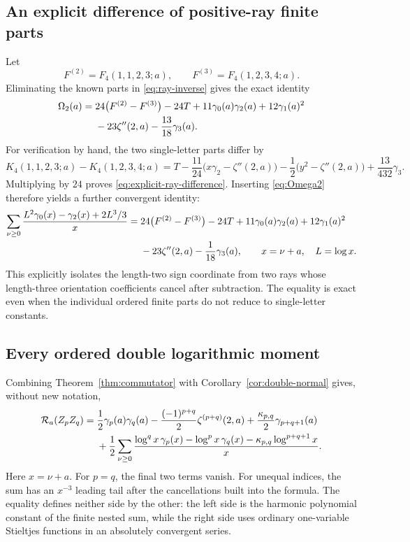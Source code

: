\documentclass[11pt]{article}
\numberwithin{equation}{section}
\theoremstyle{definition}
\newcommand{\R}{\mathcal R}
\begin{document}
\subsection{An explicit difference of positive-ray finite parts}
Let
\[
 F^{(2)}=F_4(1,1,2,3;a),\qquad F^{(3)}=F_4(1,2,3,4;a).
\]
Eliminating the known parts in \eqref{eq:ray-inverse} gives the exact
identity
\begin{align}\label{eq:explicit-ray-difference}
 \Omega_2(a)={}&24\bigl(F^{(2)}-F^{(3)}\bigr)-24T
 +11\gamma_0(a)\gamma_2(a)+12\gamma_1(a)^2\notag\\
 &-23\zeta''(2,a)-\frac{13}{18}\gamma_3(a).
\end{align}
For verification by hand, the two single-letter parts differ by
\[
 K_4(1,1,2,3;a)-K_4(1,2,3,4;a)
 =T-\frac{11}{24}\bigl(x\gamma_2-\zeta''(2,a)\bigr)
    -\frac12\bigl(y^2-\zeta''(2,a)\bigr)+\frac{13}{432}\gamma_3.
\]
Multiplying by $24$ proves \eqref{eq:explicit-ray-difference}. Inserting
\eqref{eq:Omega2} therefore yields a further convergent identity:
\begin{align}\label{eq:ray-Stieltjes-series}
 \sum_{\nu\ge0}\frac{L^2\gamma_0(x)-\gamma_2(x)+2L^3/3}{x}
 ={}&24\bigl(F^{(2)}-F^{(3)}\bigr)-24T
       +11\gamma_0(a)\gamma_2(a)+12\gamma_1(a)^2\notag\\
 &-23\zeta''(2,a)-\frac1{18}\gamma_3(a),\qquad x=\nu+a,\quad L=\log x.
\end{align}
This explicitly isolates the length-two sign coordinate from two rays
whose length-three orientation coefficients cancel after subtraction. The equality
is exact even when the individual ordered finite parts do not reduce to
single-letter constants.

\subsection{Every ordered double logarithmic moment}
Combining Theorem~\ref{thm:commutator} with
Corollary~\ref{cor:double-normal} gives, without new notation,
\begin{align}\label{eq:all-double-explicit}
 \R_a(Z_pZ_q)={}&\frac12\gamma_p(a)\gamma_q(a)
 -\frac{(-1)^{p+q}}2\zeta^{(p+q)}(2,a)
 +\frac{\kappa_{p,q}}2\gamma_{p+q+1}(a)\notag\\
 &+\frac12\sum_{\nu\ge0}
 \frac{\log^q x\,\gamma_p(x)-\log^p x\,\gamma_q(x)
                  -\kappa_{p,q}\log^{p+q+1}x}{x}.
\end{align}
Here $x=\nu+a$. For $p=q$, the final two terms vanish. For unequal indices, the sum has
an $x^{-3}$ leading tail after the cancellations built into the formula.
The equality defines neither side by the other: the left side is the
harmonic polynomial constant of the finite nested sum, while the right
side uses ordinary one-variable Stieltjes functions in an absolutely
convergent series.
\end{document}
